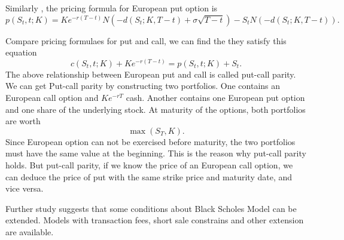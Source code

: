 \documentclass[11pt]{book}
\begin{document}
Similarly , the pricing formula for European put option is
\begin{equation}
p(S_t, t;K)= Ke^{-r(T-t)}N(-d(S_t ; K,T-t) +\sigma \sqrt{T-t})-S_t N(-d(S_t;K,T-t)).
\end{equation}

Compare pricing formulaes for put and call, we can find the they satisfy this equation
\begin{equation}
c(S_t,t;K) + K e^{-r(T-t)} = p(S_t,t;K) + S_t.
\end{equation}
The above relationship between European put and call is called put-call parity. We can get Put-call parity by constructing two portfolios. One contains an European call option and $Ke^{-rT}$ cash. Another contains one European put option and one share of the underlying stock. At maturity of the options, both portfolios are worth 
\begin{equation}
\max(S_T,K).
\end{equation}
Since European option can not be exercised before maturity, the two portfolios must have the same value at the beginning. This is the reason why put-call parity holds. But put-call parity, if we know the price of an European call option, we can deduce the price of put with the same strike price and maturity date, and vice versa.


Further study suggests that some conditions about Black Scholes Model can be extended. Models with transaction fees, short sale constrains and other extension are available.
%
\end{document}

